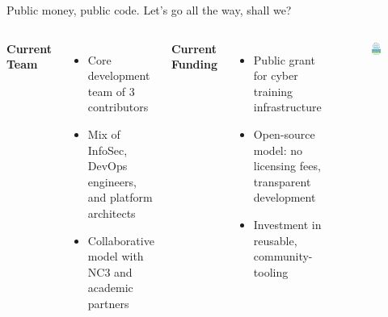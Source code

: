 \documentclass[aspectratio=169]{beamer}
\begin{document}
\begin{frame}{Public money, public code. Let's go all the way, shall we?}
  \begin{columns}[T]
    \textbf{Current Team}
    \begin{itemize}
      \item Core development team of 3 contributors
      \item Mix of InfoSec, DevOps engineers, and platform architects
      \item Collaborative model with NC3 and academic partners
    \end{itemize}
    
    \textbf{Current Funding}
    \begin{itemize}
      \item Public grant for cyber training infrastructure
      \item Open-source model: no licensing fees, transparent development
      \item Investment in reusable, community-tooling
    \end{itemize}
    
    \vspace{5mm}
    \begin{figure}
      \centering
      \includegraphics[width=\textwidth]{images/logos/FSFE_Public_Money_Public_Code_logo.pdf}
    \end{figure}
  \end{columns}
\end{frame}
\end{document}
